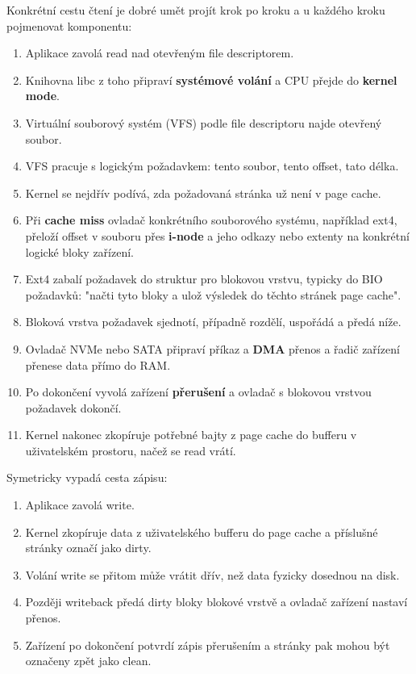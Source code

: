 Konkrétní cestu čtení je dobré umět projít krok po kroku a u každého kroku pojmenovat komponentu:
\begin{enumerate}
  \item Aplikace zavolá read nad otevřeným file descriptorem.
  \item Knihovna libc z toho připraví \textbf{systémové volání} a CPU přejde do \textbf{kernel mode}.
  \item Virtuální souborový systém (VFS) podle file descriptoru najde otevřený soubor.
  \item VFS pracuje s logickým požadavkem: tento soubor, tento offset, tato délka.
  \item Kernel se nejdřív podívá, zda požadovaná stránka už není v page cache.
  \item Při \textbf{cache miss} ovladač konkrétního souborového systému, například ext4, přeloží offset v souboru přes \textbf{i-node} a jeho odkazy nebo extenty na konkrétní logické bloky zařízení.
  \item Ext4 zabalí požadavek do struktur pro blokovou vrstvu, typicky do BIO požadavků: "načti tyto bloky a ulož výsledek do těchto stránek page cache".
  \item Bloková vrstva požadavek sjednotí, případně rozdělí, uspořádá a předá níže.
  \item Ovladač NVMe nebo SATA připraví příkaz a \textbf{DMA} přenos a řadič zařízení přenese data přímo do RAM.
  \item Po dokončení vyvolá zařízení \textbf{přerušení} a ovladač s blokovou vrstvou požadavek dokončí.
  \item Kernel nakonec zkopíruje potřebné bajty z page cache do bufferu v uživatelském prostoru, načež se read vrátí.
\end{enumerate}

Symetricky vypadá cesta zápisu:
\begin{enumerate}
  \item Aplikace zavolá write.
  \item Kernel zkopíruje data z uživatelského bufferu do page cache a příslušné stránky označí jako dirty.
  \item Volání write se přitom může vrátit dřív, než data fyzicky dosednou na disk.
  \item Později writeback předá dirty bloky blokové vrstvě a ovladač zařízení nastaví přenos.
  \item Zařízení po dokončení potvrdí zápis přerušením a stránky pak mohou být označeny zpět jako clean.
\end{enumerate}


